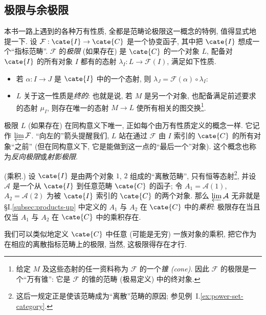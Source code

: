 \subsection{极限与余极限}
\label{subsec:limits-colimits}

本书一路上遇到的各种万有性质, 全都是范畴论极限这一概念的特例, 值得显式地提一下. 设 $\mathcal{F}:\cate{I}\to\cate{C}$ 是一个协变函子, 其中把 $\cate{I}$ 想成一个``指标范畴''. $\mathcal{F}$ 的\emph{极限} (如果存在) 是 $\cate{C}$ 的一个对象 $L$, 配备对 $\cate{I}$ 的所有对象 $I$ 都有的态射 $\lambda_I:L\to\mathcal{F}(I)$, 满足如下性质.

\begin{itemize}
\item 若 $\alpha:I\to J$ 是 $\cate{I}$ 中的一个态射, 则 $\lambda_J=\mathcal{F}(\alpha)\circ\lambda_I$:
\begin{center}
\end{center}
\item $L$ 关于这一性质是\emph{终的}: 也就是说, 若 $M$ 是另一个对象, 也配备满足前述要求的态射 $\mu_I$, 则存在唯一的态射 $M\to L$ 使所有相关的图交换\footnote{给定 $M$ 及这些态射的任一资料称为 $\mathcal{F}$ 的一个\emph{锥 (cone)}. 因此 $\mathcal{F}$ 的极限是一个``万有锥'': 它是 $\mathcal{F}$ 的锥的范畴 (极易定义) 中的终对象.}.
\end{itemize}

极限 $L$ (如果存在) 在同构意义下唯一, 正如每个由万有性质定义的概念一样. 它记作 $\varprojlim\mathcal{F}$. ``向左的''箭头提醒我们, $L$ 站在通过 $\mathcal{F}$ 由 $I$ 索引的 $\cate{C}$ 的所有对象``之前'' (但在同构意义下, 它是能做到这一点的``最后一个''对象). 这个概念也称为\emph{反向极限}或\emph{射影极限}.

\begin{example}\label{ex:products-limit}
(乘积.) 设 $\cate{I}$ 是由两个对象 $1$, $2$ 组成的``离散范畴'', 只有恒等态射\footnote{这后一规定正是使该范畴成为``离散''范畴的原因; 参见例~I.\ref{ex:power-set-category}.}, 并设 $\mathcal{A}$ 是一个从 $\cate{I}$ 到任意范畴 $\cate{C}$ 的函子; 令 $A_1=\mathcal{A}(1)$, $A_2=\mathcal{A}(2)$ 为被 $\cate{I}$ 索引的 $\cate{C}$ 的两个对象. 那么 $\varprojlim\mathcal{A}$ 无非就是 §I.\ref{subsec:products-up} 中定义的 $A_1$ 与 $A_2$ 在 $\cate{C}$ 中的\emph{乘积}: 极限存在当且仅当 $A_1$ 与 $A_2$ 在 $\cate{C}$ 中的乘积存在.

我们可以类似地定义 $\cate{C}$ 中任意 (可能是无穷) 一族对象的乘积, 把它作为在相应的离散指标范畴上的极限, 当然, 这极限得存在才行.
\end{example}

